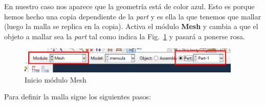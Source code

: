 En nuestro caso nos aparece que la geometría está de color azul. Esto
es porque hemos hecho una copia dependiente de la \textit{part} y es
ella la que tenemos que mallar (luego la malla se replica en la
copia). Activa el módulo \textbf{Mesh} y cambia a que el objeto a
mallar sea la \textit{part} tal como indica la Fig.~\ref{figu51} y
pasará a ponerse rosa.
\begin{figure}[H]
  \centering
  \includegraphics[width=0.95\textwidth]{./body/images/imagen51.pdf}
  \caption{Inicio módulo Mesh}
  \label{figu51}
\end{figure}

Para definir la malla sigue los siguientes pasos:
